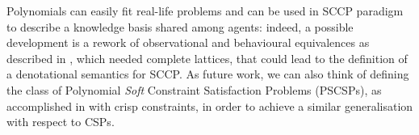 \documentclass{llncs}
\begin{document}
Polynomials can easily fit real-life problems and can be used in SCCP paradigm to describe a knowledge
basis shared among agents: indeed, a possible development is a rework of observational
and behavioural equivalences as described in \cite{jlamp17}, which needed complete lattices,
that could lead to the definition of a denotational semantics for SCCP.
As future work, we can also think of defining the class of Polynomial \emph{Soft} Constraint Satisfaction Problems (PSCSPs), 
as accomplished in \cite{pcsp09} with crisp constraints, in order to achieve a similar generalisation with respect to CSPs.




\end{document}
